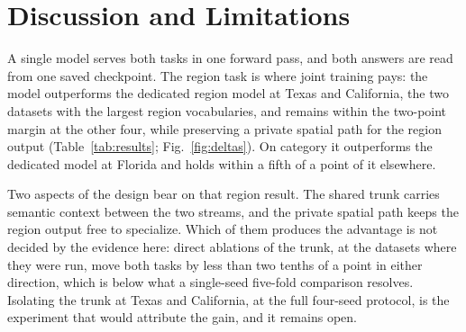 \section{Discussion and Limitations}
\label{sec:discussion}

A single model serves both tasks in one forward pass, and both answers are read from one saved
checkpoint. The region task is where joint training pays: the model outperforms the dedicated region
model at Texas and California, the two datasets with the largest region vocabularies, and remains
within the two-point margin at the other four, while preserving a private spatial path for the
region output (Table~\ref{tab:results}; Fig.~\ref{fig:deltas}). On category it outperforms the
dedicated model at Florida and holds within a fifth of a point of it elsewhere.

Two aspects of the design bear on that region result. The shared trunk carries semantic context
between the two streams, and the private spatial path keeps the region output free to specialize.
Which of them produces the advantage is not decided by the evidence here: direct ablations of the
trunk, at the datasets where they were run, move both tasks by less than two tenths of a point in
either direction, which is below what a single-seed five-fold comparison resolves. Isolating the
trunk at Texas and California, at the full four-seed protocol, is the experiment that would
attribute the gain, and it remains open.

